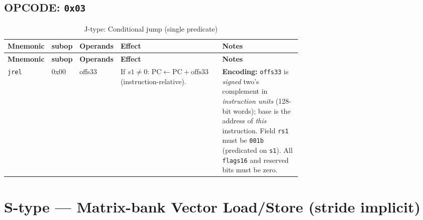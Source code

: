 \documentclass[10pt]{article}
\begin{document}
\subsection*{OPCODE: \texttt{0x03}}
\begin{longtable}{@{}l l l L{0.38\linewidth} L{0.30\linewidth}@{}}
\caption{J-type: Conditional jump (single predicate)}\label{tab:jtype}\\
\toprule
\textbf{Mnemonic} & \textbf{subop} & \textbf{Operands} & \textbf{Effect} & \textbf{Notes} \\
\midrule
\endfirsthead
\toprule
\textbf{Mnemonic} & \textbf{subop} & \textbf{Operands} & \textbf{Effect} & \textbf{Notes} \\
\midrule
\endhead
\texttt{jrel} & 0x00 & offs33 &
If $s1 \neq 0$: $\mathrm{PC} \leftarrow \mathrm{PC} + \text{offs33}$ (instruction-relative). &
\textbf{Encoding:} \texttt{offs33} is \emph{signed} two’s complement in \emph{instruction units} (128-bit words); base is the address of \emph{this} instruction. Field \texttt{rs1} must be \texttt{001b} (predicated on \texttt{s1}). All \texttt{flags16} and reserved bits must be zero. \\
\bottomrule
\end{longtable}

\section*{S-type — Matrix-bank Vector Load/Store (stride implicit)}
\end{document}
